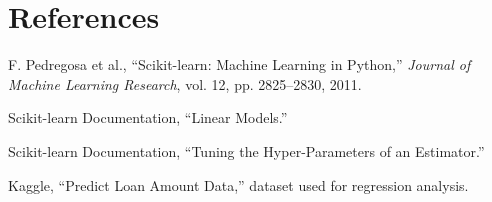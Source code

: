 \documentclass[12pt,a4paper]{article}
\begin{document}

\section{References}

\begin{enumerate}[label={[}\arabic*{]}]

    \item F. Pedregosa et al.,
    ``Scikit-learn: Machine Learning in Python,''
    \textit{Journal of Machine Learning Research},
    vol. 12, pp. 2825--2830, 2011.

    \item Scikit-learn Documentation,
    ``Linear Models.''

    \item Scikit-learn Documentation,
    ``Tuning the Hyper-Parameters of an Estimator.''

    \item Kaggle,
    ``Predict Loan Amount Data,'' dataset used for regression analysis.

\end{enumerate}
\end{document}
